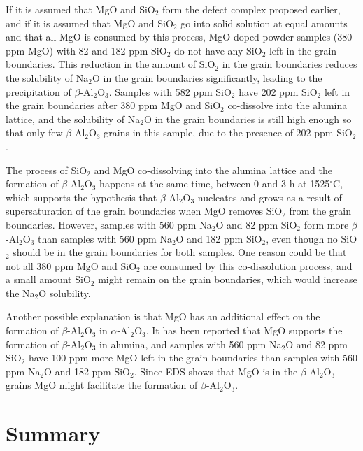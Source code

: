 If it is assumed that MgO and SiO$_{2}$ form the defect complex proposed earlier, and if it is assumed that MgO and SiO$_{2}$ go into solid solution at equal amounts and that all MgO is consumed by this process, MgO-doped powder samples (380 ppm MgO) with 82 and 182 ppm SiO$_{2}$ do not have any SiO$_{2}$ left in the grain boundaries. This reduction in the amount of SiO$_{2}$ in the grain boundaries reduces the solubility of Na$_{2}$O in the grain boundaries significantly, leading to the precipitation of $\beta$-Al$_{2}$O$_{3}$. Samples with 582 ppm SiO$_{2}$ have 202 ppm SiO$_{2}$ left in the grain boundaries after 380 ppm MgO and SiO$_{2}$ co-dissolve into the alumina lattice, and the solubility of Na$_{2}$O in the grain boundaries is still high enough so that only few $\beta$-Al$_{2}$O$_{3}$ grains in this sample, due to the presence of 202 ppm SiO$_{2}$. 

The process of SiO$_{2}$ and MgO co-dissolving into the alumina lattice and the formation of $\beta$-Al$_{2}$O$_{3}$ happens at the same time, between 0 and 3 h at 1525$^{\circ}$C, which supports the hypothesis that $\beta$-Al$_{2}$O$_{3}$ nucleates and grows as a result of supersaturation of the grain boundaries when MgO removes SiO$_{2}$ from the grain boundaries. However, samples with 560 ppm Na$_{2}$O and 82 ppm SiO$_{2}$ form more $\beta$-Al$_{2}$O$_{3}$ than samples with 560 ppm Na$_{2}$O and 182 ppm SiO$_{2}$, even though no SiO$_{2}$ should be in the grain boundaries for both samples. One reason could be that not all 380 ppm MgO and SiO$_{2}$ are consumed by this co-dissolution process, and a small amount SiO$_{2}$ might remain on the grain boundaries, which would increase the Na$_{2}$O solubility. 

Another possible explanation is that MgO has an additional effect on the formation of $\beta$-Al$_{2}$O$_{3}$ in $\alpha$-Al$_{2}$O$_{3}$. It has been reported that MgO supports the formation of $\beta$-Al$_{2}$O$_{3}$ in alumina, and samples with 560 ppm Na$_{2}$O and 82 ppm SiO$_{2}$ have 100 ppm more MgO left in the grain boundaries than samples with 560 ppm Na$_{2}$O and 182 ppm SiO$_{2}$. Since EDS shows that MgO is in the $\beta$-Al$_{2}$O$_{3}$ grains MgO might facilitate the formation of $\beta$-Al$_{2}$O$_{3}$. 

\section{Summary}




